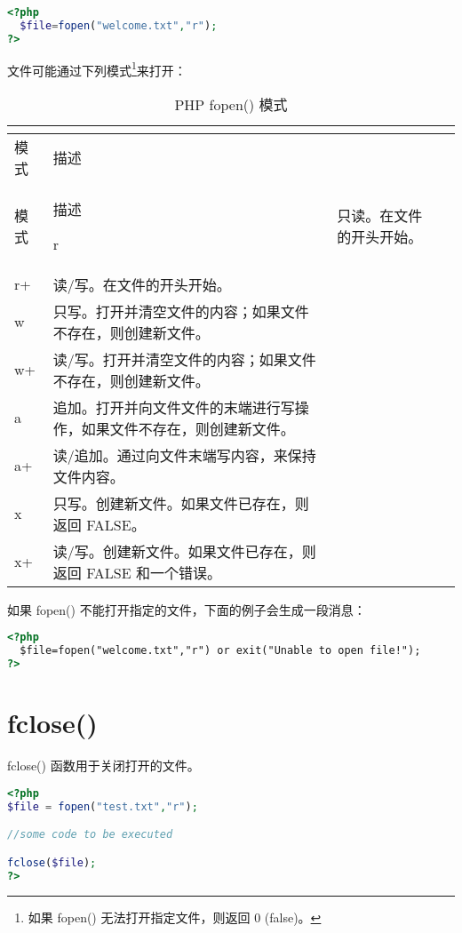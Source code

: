 \begin{lstlisting}[language=PHP]
<?php
  $file=fopen("welcome.txt","r");
?>
\end{lstlisting}

文件可能通过下列模式\footnote{如果 fopen() 无法打开指定文件，则返回 0 (false)。}来打开：


\begin{longtable}{|m{50pt}|m{300pt}|}
\tabularnewline\hline
模式	&描述
\endhead

\caption{PHP fopen() 模式}\\
\hline
模式	&描述
\endfirsthead

\endfoot

\endlastfoot

\hline
r	&只读。在文件的开头开始。\\
\hline
r+	&读/写。在文件的开头开始。\\
\hline
w	&只写。打开并清空文件的内容；如果文件不存在，则创建新文件。\\
\hline
w+	&读/写。打开并清空文件的内容；如果文件不存在，则创建新文件。\\
\hline
a	&追加。打开并向文件文件的末端进行写操作，如果文件不存在，则创建新文件。\\
\hline
a+	&读/追加。通过向文件末端写内容，来保持文件内容。\\
\hline
x	&只写。创建新文件。如果文件已存在，则返回 FALSE。\\
\hline
x+	&读/写。创建新文件。如果文件已存在，则返回 FALSE 和一个错误。\\
\hline
\end{longtable}

如果 fopen() 不能打开指定的文件，下面的例子会生成一段消息：


\begin{lstlisting}[language=HTML]
<?php
  $file=fopen("welcome.txt","r") or exit("Unable to open file!");
?>
\end{lstlisting}



\section{fclose()}

fclose() 函数用于关闭打开的文件。

\begin{lstlisting}[language=PHP]
<?php
$file = fopen("test.txt","r");

//some code to be executed

fclose($file);
?>
\end{lstlisting}


